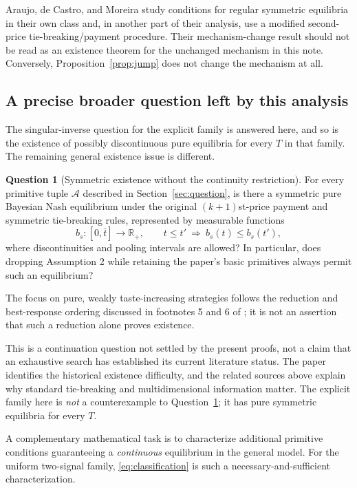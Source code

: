 \documentclass[11pt,a4paper]{article}
\numberwithin{equation}{section}
\theoremstyle{definition}
\newtheorem{question}[theorem]{Question}
\theoremstyle{remark}
\newcommand{\R}{\mathbb R}
\begin{document}
Araujo, de Castro, and Moreira \cite{ACM2004} study conditions for regular symmetric equilibria in their own class and, in another part of their analysis, use a modified second-price tie-breaking/payment procedure. Their mechanism-change result should not be read as an existence theorem for the unchanged mechanism in this note. Conversely, Proposition~\ref{prop:jump} does not change the mechanism at all.

\subsection{A precise broader question left by this analysis}
The singular-inverse question for the explicit family is answered here, and so is the existence of possibly discontinuous pure equilibria for every $T$ in that family. The remaining general existence issue is different.

\begin{question}[Symmetric existence without the continuity restriction]
\label{q:remaining}
For every primitive tuple $\mathcal A$ described in Section~\ref{sec:question}, is there a symmetric pure Bayesian Nash equilibrium under the original $(k+1)$st-price payment and symmetric tie-breaking rules, represented by measurable functions
\[
 b_s:[0,\bar t]\longrightarrow\R_+,
 \qquad t\le t'\ \Longrightarrow\ b_s(t)\le b_s(t'),
\]
where discontinuities and pooling intervals are allowed? In particular, does dropping Assumption 2 while retaining the paper's basic primitives always permit such an equilibrium?
\end{question}

The focus on pure, weakly taste-increasing strategies follows the reduction and best-response ordering discussed in footnotes 5 and 6 of \cite[p.~503]{PS2000}; it is not an assertion that such a reduction alone proves existence.

This is a continuation question not settled by the present proofs, not a claim that an exhaustive search has established its current literature status. The paper identifies the historical existence difficulty, and the related sources above explain why standard tie-breaking and multidimensional information matter. The explicit family here is \emph{not} a counterexample to Question~\ref{q:remaining}; it has pure symmetric equilibria for every $T$.

A complementary mathematical task is to characterize additional primitive conditions guaranteeing a \emph{continuous} equilibrium in the general model. For the uniform two-signal family, \eqref{eq:classification} is such a necessary-and-sufficient characterization.
\end{document}
